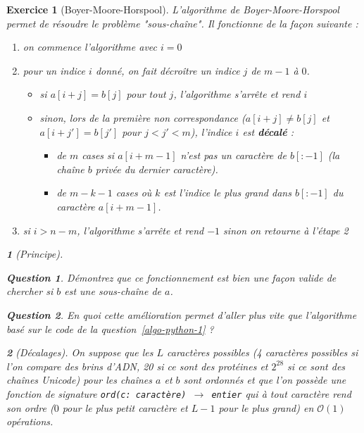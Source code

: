 \documentclass{article}
\theoremstyle{exostyle}
\newtheorem{exo}{Exercice}
\theoremstyle{partiestyle}
\newtheorem{partie}{}[exo]
\theoremstyle{questionstyle}
\newtheorem{questionpartie}{Question}[partie]
\begin{document}
\begin{exo}[Boyer-Moore-Horspool]
    L'algorithme de Boyer-Moore-Horspool  permet de résoudre le problème "sous-chaîne". Il fonctionne de la façon suivante :

    \begin{enumerate}
        \item on commence l'algorithme avec $i= 0$
        \item pour un indice $i$ donné, on fait décroître un indice $j$ de $m-1$ à $0$.
        \begin{itemize}
            \item si $a[i + j] = b[j]$ pour tout $j$, l'algorithme s'arrête et rend $i$
            \item sinon, lors de la première non correspondance ($a[i + j] \neq b[j]$ et $a[i + j'] = b[j']$ pour $j < j' < m$), l'indice $i$ est {\bf décalé} :
            \begin{itemize}
                \item de $m$ cases si $a[i +m-1]$ n'est pas un caractère de $b[:-1]$ (la chaîne $b$ privée du dernier caractère).
                \item de $m-k-1$ cases où $k$ est l'indice le plus grand dans $b[:-1]$ du caractère $a[i + m -1]$.
            \end{itemize}
        \end{itemize}
        \item si $i> n-m$, l'algorithme s'arrête et rend $-1$ sinon on retourne à l'étape 2
    \end{enumerate}
    \begin{partie}[Principe]
    \begin{questionpartie}
            Démontrez que ce fonctionnement est bien une façon valide de chercher si $b$ est une sous-chaîne de $a$.
    \end{questionpartie}
    \begin{questionpartie}
            En quoi cette amélioration permet d'aller plus vite que l'algorithme basé sur le code de la question~\ref{algo-python-1} ?
    \end{questionpartie}
    \end{partie}
    \begin{partie}[Décalages]
        On suppose que les $L$ caractères possibles  (4 caractères possibles si l'on compare des brins d'ADN, 20 si ce sont des protéines et $2^{28}$ si ce sont des chaînes Unicode)  pour les chaînes $a$ et $b$ sont ordonnés et que l'on possède une fonction de signature \texttt{ord(c: caractère) $\rightarrow$ entier} qui à tout caractère rend son ordre ($0$ pour le plus petit caractère et $L-1$ pour le plus grand) en $\mathcal{O}(1)$ opérations.

\end{partie}
\end{exo}
\end{document}
